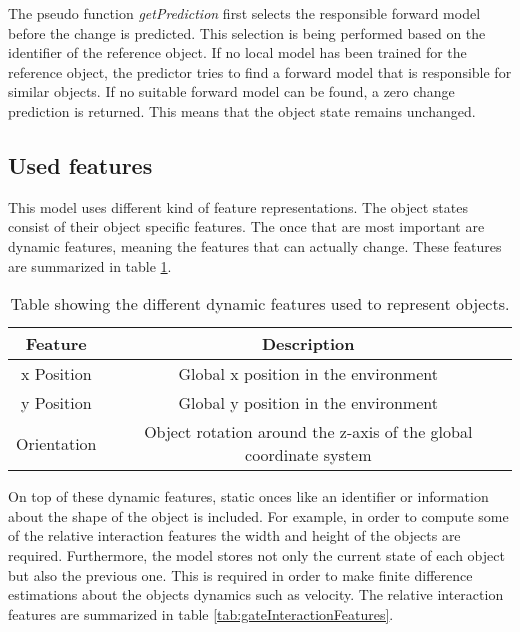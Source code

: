 The pseudo function \textit{getPrediction} first selects the responsible forward model before the change is predicted. This selection is being performed based on the identifier of the reference object. If no local model has been trained for the reference object, the predictor tries to find a forward model that is responsible for similar objects. If no suitable forward model can be found, a zero change prediction is returned. This means that the object state remains unchanged.


\subsection{Used features \label{sec:gateFeatures}}

This model uses different kind of feature representations. The object states consist of their object specific features. The once that are most important are dynamic features, meaning the features that can actually change. These features are summarized in table \ref{tab:gateObjectFeatures}.

\begin{table}
	\centering
	\begin{tabular}{|c|c|}
		\hline Feature & Description \\ 
		\hline x Position & Global x position in the environment \\ 
		\hline y Position & Global y position in the environment \\ 
		\hline Orientation & Object rotation around the z-axis of the global coordinate system \\ 
		\hline 
	\end{tabular} 
	\caption{Table showing the different dynamic features used to represent objects.}
	\label{tab:gateObjectFeatures}
\end{table}

On top of these dynamic features, static onces like an identifier or information about the shape of the object is included. For example, in order to compute some of the relative interaction features the width and height of the objects are required. Furthermore, the model stores not only the current state of each object but also the previous one. This is required in order to make finite difference estimations about the objects dynamics such as velocity. 
The relative interaction features are summarized in table \ref{tab:gateInteractionFeatures}. 

